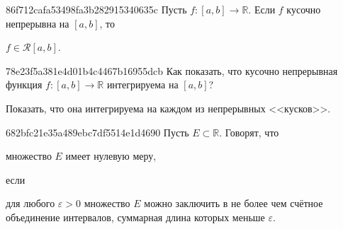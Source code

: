 \begin{note}{86f712cafa53498fa3b282915340635c}
    Пусть \({ f : [a, b] \to \mathbb R }\). Если \({ f }\) кусочно непрерывна на \({ [a, b] }\), то \begin{icloze}{1}\({ f \in \mathcal R[a, b] }\).\end{icloze}
\end{note}

\begin{note}{78e23f5a381e4d01b4c4467b16955dcb}
    Как показать, что кусочно непрерывная функция \({ f : [a, b] \to \mathbb R }\) интегрируема на \({ [a, b] }\)?

    \begin{cloze}{1}
        Показать, что она интегрируема на каждом из непрерывных <<кусков>>.
    \end{cloze}
\end{note}

\begin{note}{682bfc21e35a489ebc7df5514e1d4690}
    Пусть \({ E \subset \mathbb R }\). Говорят, что \begin{icloze}{2}множество \({ E }\) имеет нулевую меру,\end{icloze} если \begin{icloze}{1}для любого \({ \varepsilon > 0 }\) множество \({ E }\) можно заключить  в не более чем счётное объединение интервалов, суммарная длина которых меньше \({ \varepsilon }\).\end{icloze}
\end{note}


